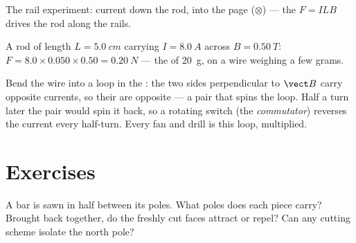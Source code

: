 \begin{omfigure}

{\small The rail experiment: current down the rod,  into the page
($\otimes$) --- the  $F = ILB$ drives the rod along the
rails.}
\end{omfigure}

\begin{example}\label{ex:g11:magnetic-fields:laplace}
A rod of length $L = \qty{5.0}{cm}$ carrying $I = \qty{8.0}{A}$ across
$B = \qty{0.50}{T}$: $F = 8.0 \times 0.050 \times 0.50 = \qty{0.20}{N}$
--- the  of \qty{20}{g}, on a wire weighing a few grams.
\end{example}

\begin{remark}\label{rem:g11:magnetic-fields:motor}
Bend the wire into a loop in the : the two sides perpendicular to
$\vect B$ carry opposite currents, so their  are opposite
--- a pair that spins the loop. Half a turn later the pair would spin
it back, so a rotating switch (the \emph{commutator}) reverses the
current every half-turn. Every fan and drill is this loop, multiplied.
\end{remark}

\section{Exercises}

\begin{exercise}[$\star$]\label{exo:g11:magnetic-fields:1}
A bar  is sawn in half between its poles. What poles does each
piece carry? Brought back together, do the freshly cut faces attract
or repel? Can any cutting scheme isolate the north pole?
\end{exercise}

